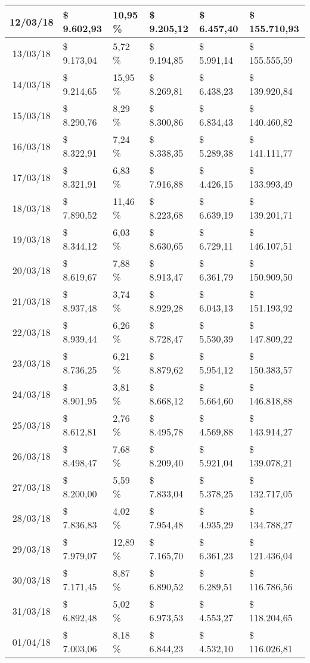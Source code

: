 \begin{small}
\begin{longtable}{|c|l|l|l|l|l|}
12/03/18 & \$ 9.602,93 & 10,95 \% & \$ 9.205,12 & \$ 6.457,40 & \$ 155.710,93 \\ \hline
13/03/18 & \$ 9.173,04 & 5,72 \% & \$ 9.194,85 & \$ 5.991,14 & \$ 155.555,59 \\ \hline
14/03/18 & \$ 9.214,65 & 15,95 \% & \$ 8.269,81 & \$ 6.438,23 & \$ 139.920,84 \\ \hline
15/03/18 & \$ 8.290,76 & 8,29 \% & \$ 8.300,86 & \$ 6.834,43 & \$ 140.460,82 \\ \hline
16/03/18 & \$ 8.322,91 & 7,24 \% & \$ 8.338,35 & \$ 5.289,38 & \$ 141.111,77 \\ \hline
17/03/18 & \$ 8.321,91 & 6,83 \% & \$ 7.916,88 & \$ 4.426,15 & \$ 133.993,49 \\ \hline
18/03/18 & \$ 7.890,52 & 11,46 \% & \$ 8.223,68 & \$ 6.639,19 & \$ 139.201,71 \\ \hline
19/03/18 & \$ 8.344,12 & 6,03 \% & \$ 8.630,65 & \$ 6.729,11 & \$ 146.107,51 \\ \hline
20/03/18 & \$ 8.619,67 & 7,88 \% & \$ 8.913,47 & \$ 6.361,79 & \$ 150.909,50 \\ \hline
21/03/18 & \$ 8.937,48 & 3,74 \% & \$ 8.929,28 & \$ 6.043,13 & \$ 151.193,92 \\ \hline
22/03/18 & \$ 8.939,44 & 6,26 \% & \$ 8.728,47 & \$ 5.530,39 & \$ 147.809,22 \\ \hline
23/03/18 & \$ 8.736,25 & 6,21 \% & \$ 8.879,62 & \$ 5.954,12 & \$ 150.383,57 \\ \hline
24/03/18 & \$ 8.901,95 & 3,81 \% & \$ 8.668,12 & \$ 5.664,60 & \$ 146.818,88 \\ \hline
25/03/18 & \$ 8.612,81 & 2,76 \% & \$ 8.495,78 & \$ 4.569,88 & \$ 143.914,27 \\ \hline
26/03/18 & \$ 8.498,47 & 7,68 \% & \$ 8.209,40 & \$ 5.921,04 & \$ 139.078,21 \\ \hline
27/03/18 & \$ 8.200,00 & 5,59 \% & \$ 7.833,04 & \$ 5.378,25 & \$ 132.717,05 \\ \hline
28/03/18 & \$ 7.836,83 & 4,02 \% & \$ 7.954,48 & \$ 4.935,29 & \$ 134.788,27 \\ \hline
29/03/18 & \$ 7.979,07 & 12,89 \% & \$ 7.165,70 & \$ 6.361,23 & \$ 121.436,04 \\ \hline
30/03/18 & \$ 7.171,45 & 8,87 \% & \$ 6.890,52 & \$ 6.289,51 & \$ 116.786,56 \\ \hline
31/03/18 & \$ 6.892,48 & 5,02 \% & \$ 6.973,53 & \$ 4.553,27 & \$ 118.204,65 \\ \hline
01/04/18 & \$ 7.003,06 & 8,18 \% & \$ 6.844,23 & \$ 4.532,10 & \$ 116.026,81 \\ \hline

\end{longtable}
\end{small}
